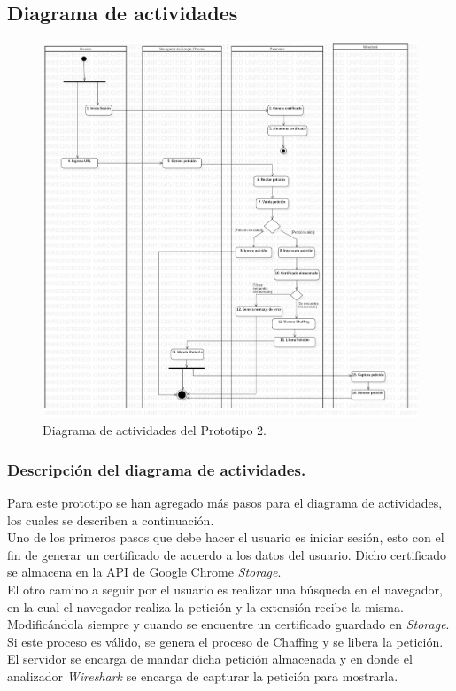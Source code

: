 \documentclass[12pt, a4paper, titlepage]{report}
\begin{document}
		
		
		\subsection{Diagrama de actividades}
		    \begin{figure}[H]
				\begin{center}	\includegraphics[width=15cm]{./imagenes/Desarrollo/Prototipo_2/DA_P2.png}
					\caption{Diagrama de actividades del Prototipo 2.}
				\end{center}
			\end{figure}
		
		\subsubsection{Descripción del diagrama de actividades.}
		Para este prototipo se han agregado más pasos para el diagrama de actividades, los cuales se describen a 
    	continuación.\\
    	Uno de los primeros pasos que debe hacer el usuario es iniciar sesión, esto con el fin de generar un certificado de acuerdo a los datos del usuario. Dicho certificado se almacena en la API de Google Chrome \textit{Storage}. \\
    	El otro camino a seguir por el usuario es realizar una búsqueda en el navegador, en la cual el navegador realiza la petición y la extensión recibe la misma. Modificándola siempre y cuando se encuentre un certificado guardado en \textit{Storage}. Si este proceso es válido, se genera el proceso de Chaffing y se libera la petición. El servidor se encarga de mandar dicha petición almacenada y en donde el analizador \textit{Wireshark} se encarga de capturar la petición para mostrarla.
			
\end{document}

